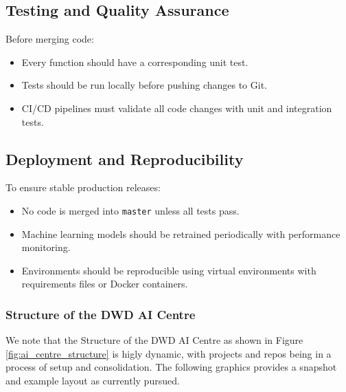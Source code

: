 \subsection{Testing and Quality Assurance}
Before merging code:

\begin{itemize}[itemsep=1pt,topsep=3pt]
    \item Every function should have a corresponding unit test.
    \item Tests should be run locally before pushing changes to Git.
    \item CI/CD pipelines must validate all code changes with unit and integration tests.
\end{itemize}

\subsection{Deployment and Reproducibility}
To ensure stable production releases:

\begin{itemize}[itemsep=1pt,topsep=3pt]
    \item No code is merged into \texttt{master} unless all tests pass.
    \item Machine learning models should be retrained periodically with performance monitoring.
    \item Environments should be reproducible using virtual environments with requirements files or Docker containers.
\end{itemize}

%
\subsubsection{Structure of the DWD AI Centre}

We note that the Structure of the DWD AI Centre as shown in Figure \ref{fig:ai_centre_structure} is higly dynamic, with projects and repos being in a process of setup and consolidation. The following graphics provides a snapshot and example layout as currently pursued. 

